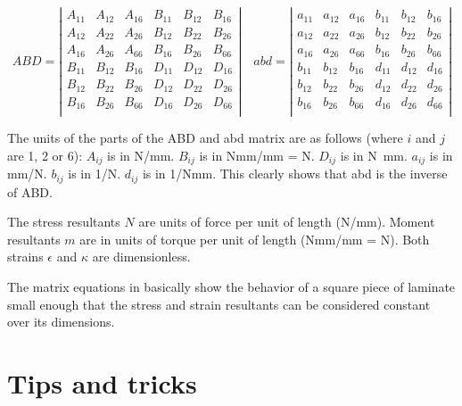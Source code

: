 \documentclass[a4paper,landscape,oneside,11pt,twocolumn]{memoir}
\begin{document}
\[
    ABD = \left|\begin{array}{cccccc}
        A_{11} & A_{12} & A_{16} & B_{11} & B_{12} & B_{16}\\
        A_{12} & A_{22} & A_{26} & B_{12} & B_{22} & B_{26}\\
        A_{16} & A_{26} & A_{66} & B_{16} & B_{26} & B_{66}\\
        B_{11} & B_{12} & B_{16} & D_{11} & D_{12} & D_{16}\\
        B_{12} & B_{22} & B_{26} & D_{12} & D_{22} & D_{26}\\
        B_{16} & B_{26} & B_{66} & D_{16} & D_{26} & D_{66}\\
    \end{array}\right|\quad
    abd = \left|\begin{array}{cccccc}
        a_{11} & a_{12} & a_{16} & b_{11} & b_{12} & b_{16}\\
        a_{12} & a_{22} & a_{26} & b_{12} & b_{22} & b_{26}\\
        a_{16} & a_{26} & a_{66} & b_{16} & b_{26} & b_{66}\\
        b_{11} & b_{12} & b_{16} & d_{11} & d_{12} & d_{16}\\
        b_{12} & b_{22} & b_{26} & d_{12} & d_{22} & d_{26}\\
        b_{16} & b_{26} & b_{66} & d_{16} & d_{26} & d_{66}\\
    \end{array}\right|
\]

The units of the parts of the ABD and abd matrix are as follows (where $i$ and
$j$ are 1, 2 or 6): $A_{ij}$ is in \si{N/mm}. $B_{ij}$ is in \si{Nmm/mm}
= \si{N}.  $D_{ij}$ is in \si{N.mm}.  $a_{ij}$ is in \si{mm/N}.  $b_{ij}$ is
in \si{1/N}.  $d_{ij}$ is in \si{1/Nmm}. This clearly shows that abd is the
inverse of ABD.

The stress resultants $N$ are units of force per unit of length (\si{N/mm}).
Moment resultants $m$ are in units of torque per unit of length (\si{Nmm/mm}
= \si{N}). Both strains $\epsilon$ and $\kappa$ are dimensionless.

The matrix equations in  basically show the
behavior of a square piece of laminate small enough that the stress and strain
resultants can be considered constant over its dimensions.


\chapter{Tips and tricks} %
\end{document}
